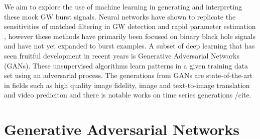 \documentclass[%
 reprint,
 amsmath,amssymb,
 aps,
]{revtex4-2}
\begin{document}
We aim to explore the use of machine learning in generating and interpreting these mock GW burst signals. Neural networks have shown to replicate the sensitivities of matched filtering in GW detection \cite{} and rapid parameter estimation \cite{}, however these methods have primarily been focused on binary black hole signals and have not yet expanded to burst examples. A subset of deep learning that has seen fruitful development in recent years \cite{} is Generative Adversarial Networks (GANs). These unsupervised algorithms learn patterns in a given training data set using an adversarial process. The generations from GANs are state-of-the-art in fields such as high quality image fidelity, image and text-to-image translation and video prediciton \cite{} and there is notable works on time series generations /cite. 





\begin{comment}
The detections of gravitational waves by Advanced Laser Interferometer
Gravitational wave Observatory (aLIGO) and Advanced Virgo [1–5], have opened up
new avenues to explore the Universe. Astrophysical sources of transient
gravitational waves include the merging of compact binary star systems like
black holes and/or neutron stars [6], core-collapse supernova [7], pulsar
glitches [8] and other events involving accelerating massive objects.
Gravitational wave bursts (GWBs) are an exciting area of research as the
emissions process of such waves is not well understood. The waveforms often
depend on complicated orbital dynamics and equations of state which limit the
sensitivity on searching for burst sources. Typically, the duration of burst
signals are short with amplitudes that can be greater than the detector noise.
Burst searches look for excess power contained in a time-frequency plot and
rely on consistent arrival times, waveform shapes and frequencies between
detectors. We focus on utilising an unsupervised form of machine learning
called Generative Adversarial Networks [9] as a generalised GW transient
search. A two detector case is considered such that the signals retain their
form between detections and a defined time delay between detections relating to
the sky orientation of the source.
\end{comment}

\section{Generative Adversarial Networks}
\end{document}
